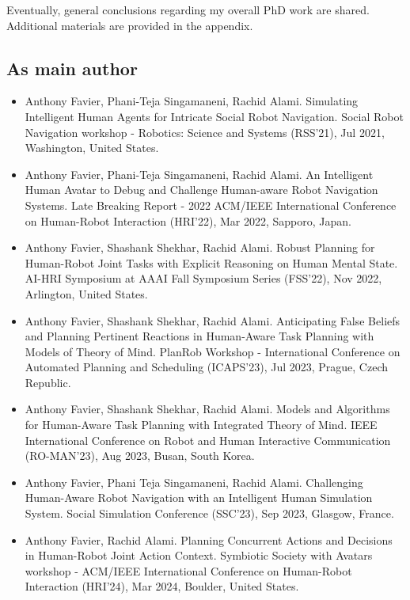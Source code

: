 Eventually, general conclusions regarding my overall PhD work are shared. Additional materials are provided in the appendix.  


\subsection*{As main author}
\begin{itemize}

    \item Anthony Favier, Phani-Teja Singamaneni, Rachid Alami. Simulating Intelligent Human Agents for Intricate Social Robot Navigation. Social Robot Navigation workshop - Robotics: Science and Systems (RSS'21), Jul 2021, Washington, United States. 
    \item Anthony Favier, Phani-Teja Singamaneni, Rachid Alami. An Intelligent Human Avatar to Debug and Challenge Human-aware Robot Navigation Systems. Late Breaking Report - 2022 ACM/IEEE International Conference on Human-Robot Interaction (HRI'22), Mar 2022, Sapporo, Japan. 
    \item Anthony Favier, Shashank Shekhar, Rachid Alami. Robust Planning for Human-Robot Joint Tasks with Explicit Reasoning on Human Mental State. AI-HRI Symposium at AAAI Fall Symposium Series (FSS'22), Nov 2022, Arlington, United States. 
    \item Anthony Favier, Shashank Shekhar, Rachid Alami. Anticipating False Beliefs and Planning Pertinent Reactions in Human-Aware Task Planning with Models of Theory of Mind. PlanRob Workshop - International Conference on Automated Planning and Scheduling (ICAPS'23), Jul 2023, Prague, Czech Republic. 
    \item Anthony Favier, Shashank Shekhar, Rachid Alami. Models and Algorithms for Human-Aware Task Planning with Integrated Theory of Mind. IEEE International Conference on Robot and Human Interactive Communication (RO-MAN'23), Aug 2023, Busan, South Korea. 
    \item Anthony Favier, Phani Teja Singamaneni, Rachid Alami. Challenging Human-Aware Robot Navigation with an Intelligent Human Simulation System. Social Simulation Conference (SSC'23), Sep 2023, Glasgow, France. 
    \item Anthony Favier, Rachid Alami. Planning Concurrent Actions and Decisions in Human-Robot Joint Action Context. Symbiotic Society with Avatars workshop - ACM/IEEE International Conference on Human-Robot Interaction (HRI'24), Mar 2024, Boulder, United States.

\end{itemize}
    
